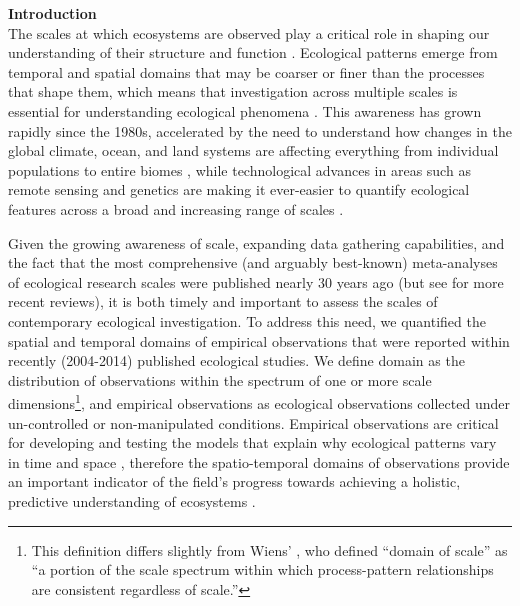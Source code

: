 \documentclass[12pt]{article}
\begin{document}
\vspace{10pt}
\noindent \textbf{Introduction}
\vspace{5pt}
\\
The scales at which ecosystems are observed play a critical role in shaping our understanding of their structure and function \cite{levin_problem_1992,chave_problem_2013,wiens_spatial_1989}.  Ecological patterns emerge from temporal and spatial domains that may be coarser or finer than the processes that shape them, which means that investigation across multiple scales is essential for understanding ecological phenomena \cite{levin_problem_1992,sandel_scale_2009}. This awareness has grown rapidly since the 1980s, accelerated by the need to understand how changes in the global climate, ocean, and land systems are affecting everything from individual populations \cite{tingley_push_2012} to entire biomes \cite{xiao_photosynthetic_2004}, while technological advances in areas such as remote sensing and genetics are making it ever-easier to quantify ecological features across a broad and increasing range of scales \cite{schneider_rise_2001, chave_problem_2013}.  

Given the growing awareness of scale, expanding data gathering capabilities, and the fact that the most comprehensive (and arguably best-known) meta-analyses \cite{tilman_ecological_1989,kareiva_spatial_1988} of ecological research scales were published nearly 30 years ago (but see \cite{porter_crop_2005,sandel_scale_2009} for more recent reviews), it is both timely and important to assess the scales of contemporary ecological investigation. To address this need, we quantified the spatial and temporal domains of empirical observations that were reported within recently (2004-2014) published ecological studies. We define domain as the distribution of observations within the spectrum of one or more scale dimensions\footnote{This definition differs slightly from Wiens' \cite{wiens_spatial_1989}, who defined ``domain of scale'' as ``a portion of the scale spectrum within which process-pattern relationships are consistent regardless of scale.''}, and empirical observations as ecological observations collected under un-controlled or non-manipulated conditions. Empirical observations are critical for developing and testing the models that explain why ecological patterns vary in time and space \cite{levin_problem_1992, tilman_ecological_1989}, therefore the spatio-temporal domains of observations provide an important indicator of the field's progress towards achieving a holistic, predictive understanding of ecosystems \cite{chave_problem_2013,levin_problem_1992}. 
\end{document}
